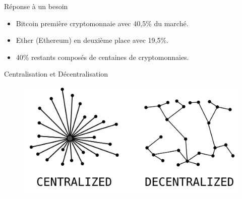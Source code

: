 \begin{frame}{Réponse à un besoin}
        \begin{itemize}
        \item Bitcoin première cryptomonnaie avec 40,5\% du marché.
        \item Ether (Ethereum) en deuxième place avec 19,5\%.
        \item 40\% restants composés de centaines de cryptomonnaies.
    \end{itemize}
\end{frame}

    \begin{frame}{Centralisation et Décentralisation}
        \begin{figure}
            \centering
            \includegraphics[scale = 0.2]{introduction/CentralDecentral.png}
        \end{figure}
    \end{frame}